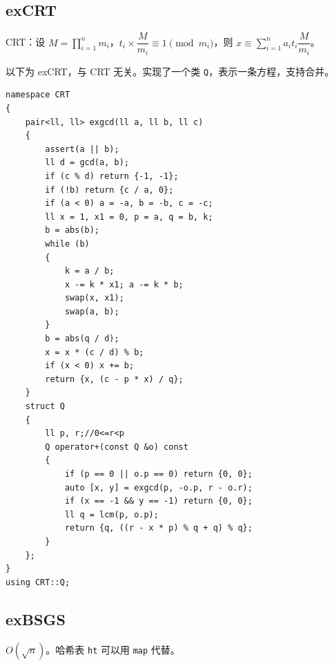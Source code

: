 \documentclass[12pt]{ctexart}
\begin{document}
\subsection{exCRT}

CRT：设 $M=\prod\limits_{i=1}^nm_i$，$t_i\times \dfrac {M}{m_i}\equiv 1\pmod {m_i}$，则 $x\equiv \sum\limits_{i=1}^na_it_i\dfrac {M}{m_i}$。

以下为 exCRT，与 CRT 无关。实现了一个类 \verb|Q|，表示一条方程，支持合并。

\begin{lstlisting}
namespace CRT
{
	pair<ll, ll> exgcd(ll a, ll b, ll c)
	{
		assert(a || b);
		ll d = gcd(a, b);
		if (c % d) return {-1, -1};
		if (!b) return {c / a, 0};
		if (a < 0) a = -a, b = -b, c = -c;
		ll x = 1, x1 = 0, p = a, q = b, k;
		b = abs(b);
		while (b)
		{
			k = a / b;
			x -= k * x1; a -= k * b;
			swap(x, x1);
			swap(a, b);
		}
		b = abs(q / d);
		x = x * (c / d) % b;
		if (x < 0) x += b;
		return {x, (c - p * x) / q};
	}
	struct Q
	{
		ll p, r;//0<=r<p
		Q operator+(const Q &o) const
		{
			if (p == 0 || o.p == 0) return {0, 0};
			auto [x, y] = exgcd(p, -o.p, r - o.r);
			if (x == -1 && y == -1) return {0, 0};
			ll q = lcm(p, o.p);
			return {q, ((r - x * p) % q + q) % q};
		}
	};
}
using CRT::Q;

\end{lstlisting}


\subsection{exBSGS}

$O(\sqrt n)$。哈希表 \verb|ht| 可以用 \verb|map| 代替。
\end{document}
